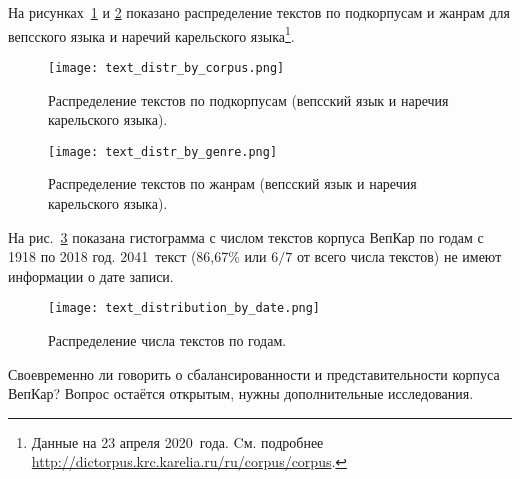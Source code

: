 На рисунках~\ref{fig:text_distr_by_corpus} и \ref{fig:text_distr_by_genre} 
показано распределение текстов по подкорпусам и жанрам для вепсского языка 
и наречий карельского языка\footnote{Данные 
                                     на 23 апреля 2020~года. Cм. подробнее 
			\href{http://dictorpus.krc.karelia.ru/ru/corpus/corpus}{http://dictorpus.krc.karelia.ru/ru/corpus/corpus}.}.

\begin{figure}
    \centering
    \texttt{[image: text\_distr\_by\_corpus.png]}
    \caption[Распределение текстов по подкорпусам]{Распределение текстов по подкорпусам (вепсский язык и наречия карельского языка).}
    \label{fig:text_distr_by_corpus}
\end{figure}

\begin{figure}
    \centering
    \texttt{[image: text\_distr\_by\_genre.png]}
    \caption[Распределение текстов по жанрам]{Распределение текстов по жанрам (вепсский язык и наречия карельского языка).}
    \label{fig:text_distr_by_genre}
\end{figure}

На рис.~\ref{fig:text_distribution_by_date} показана гистограмма 
с числом текстов корпуса ВепКар по годам с 1918 по 2018 год. 
2041~текст (86,67\% или $6/7$ от всего числа текстов) не имеют информации о дате записи.
\begin{figure}
    \centering
    \texttt{[image: text\_distribution\_by\_date.png]}
    \caption{Распределение числа текстов по годам.}
    \label{fig:text_distribution_by_date}
\end{figure}

Своевременно ли говорить о сбалансированности и представительности корпуса ВепКар? Вопрос остаётся открытым, нужны дополнительные исследования.




